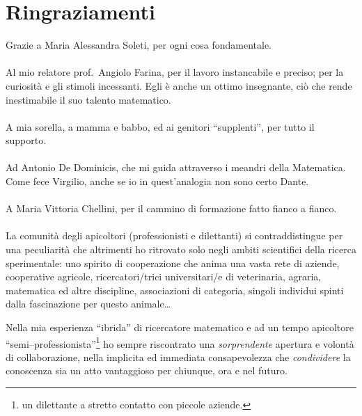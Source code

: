 \cleardoublepage
{} %
\section*{Ringraziamenti}
Grazie a Maria Alessandra Soleti, per ogni cosa fondamentale.

\paragraph{}
Al mio relatore prof.~Angiolo Farina, per il lavoro instancabile e preciso; per la curiosità e gli stimoli incessanti.
Egli è anche un ottimo insegnante, ciò che rende inestimabile il suo talento matematico.

\paragraph{}
A mia sorella, a mamma e babbo, ed ai genitori ``supplenti'', per tutto il supporto.

\paragraph{}
Ad Antonio De Dominicis, che mi guida attraverso i meandri della Matematica.
Come fece Virgilio, anche se io in quest'analogia non sono certo Dante.

\paragraph{}
A Maria Vittoria Chellini, per il cammino di formazione fatto fianco a fianco.

\paragraph{}
La comunità degli apicoltori (professionisti e dilettanti) si contraddistingue per una peculiarità
che altrimenti ho ritrovato solo negli ambiti scientifici della ricerca sperimentale: uno spirito di cooperazione
che anima una vasta rete di aziende, cooperative agricole, ricercatori/trici universitari/e di veterinaria, agraria,
matematica ed altre discipline, associazioni di categoria, singoli individui spinti dalla fascinazione per
questo animale\dots

Nella mia esperienza ``ibrida'' di ricercatore matematico e ad un tempo
apicoltore ``semi--professionista''\footnote{\ie un dilettante a stretto contatto con piccole aziende.}
ho sempre riscontrato una \emph{sorprendente} apertura e volontà di collaborazione, nella implicita ed immediata
consapevolezza che \emph{condividere} la conoscenza sia un atto vantaggioso per chiunque, ora e nel futuro.

